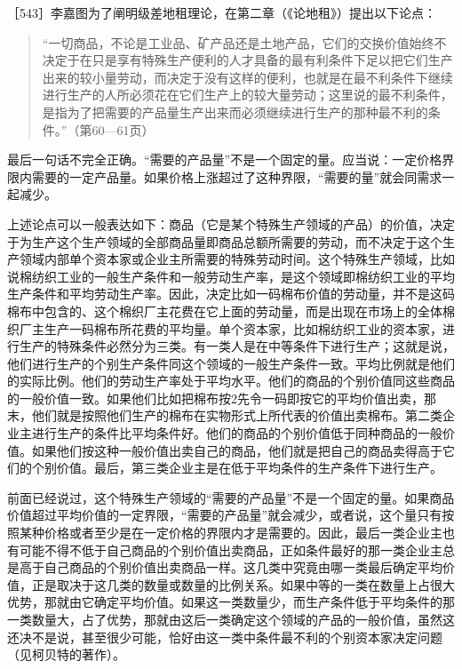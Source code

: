 

［543］李嘉图为了阐明级差地租理论，在第二章（《论地租》）提出以下论点：

\begin{quote}{“一切商品，不论是工业品、矿产品还是土地产品，它们的交换价值始终不决定于在只是享有特殊生产便利的人才具备的最有利条件下足以把它们生产出来的较小量劳动，而决定于没有这样的便利，也就是在最不利条件下继续进行生产的人所必须花在它们生产上的较大量劳动；这里说的最不利条件，是指为了把需要的产品量生产出来而必须继续进行生产的那种最不利的条件。”（第60—61页）}\end{quote}

最后一句话不完全正确。“需要的产品量”不是一个固定的量。应当说：一定价格界限内需要的一定产品量。如果价格上涨超过了这种界限，“需要的量”就会同需求一起减少。

上述论点可以一般表达如下：商品（它是某个特殊生产领域的产品）的价值，决定于为生产这个生产领域的全部商品量即商品总额所需要的劳动，而不决定于这个生产领域内部单个资本家或企业主所需要的特殊劳动时间。这个特殊生产领域，比如说棉纺织工业的一般生产条件和一般劳动生产率，是这个领域即棉纺织工业的平均生产条件和平均劳动生产率。因此，决定比如一码棉布价值的劳动量，并不是这码棉布中包含的、这个棉织厂主花费在它上面的劳动量，而是出现在市场上的全体棉织厂主生产一码棉布所花费的平均量。单个资本家，比如棉纺织工业的资本家，进行生产的特殊条件必然分为三类。有一类人是在中等条件下进行生产；这就是说，他们进行生产的个别生产条件同这个领域的一般生产条件一致。平均比例就是他们的实际比例。他们的劳动生产率处于平均水平。他们的商品的个别价值同这些商品的一般价值一致。如果他们比如把棉布按2先令一码即按它的平均价值出卖，那末，他们就是按照他们生产的棉布在实物形式上所代表的价值出卖棉布。第二类企业主进行生产的条件比平均条件好。他们的商品的个别价值低于同种商品的一般价值。如果他们按这种一般价值出卖自己的商品，他们就是把自己的商品卖得高于它们的个别价值。最后，第三类企业主是在低于平均条件的生产条件下进行生产。

前面已经说过，这个特殊生产领域的“需要的产品量”不是一个固定的量。如果商品价值超过平均价值的一定界限，“需要的产品量”就会减少，或者说，这个量只有按照某种价格或者至少是在一定价格的界限内才是需要的。因此，最后一类企业主也有可能不得不低于自己商品的个别价值出卖商品，正如条件最好的那一类企业主总是高于自己商品的个别价值出卖商品一样。这几类中究竟由哪一类最后确定平均价值，正是取决于这几类的数量或数量的比例关系。如果中等的一类在数量上占很大优势，那就由它确定平均价值。如果这一类数量少，而生产条件低于平均条件的那一类数量大，占了优势，那就由这后一类确定这个领域的产品的一般价值，虽然这还决不是说，甚至很少可能，恰好由这一类中条件最不利的个别资本家决定问题（见柯贝特的著作）。


